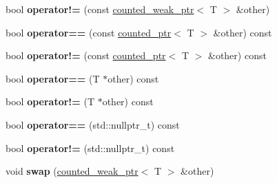 \begin{DoxyCompactItemize}
\item 
\hypertarget{classcounted__weak__ptr_adfcb9a42edff0c699afd47e72a165a14}{}bool {\bfseries operator!=} (const \hyperlink{classcounted__weak__ptr}{counted\+\_\+weak\+\_\+ptr}$<$ T $>$ \&other)\label{classcounted__weak__ptr_adfcb9a42edff0c699afd47e72a165a14}

\item 
\hypertarget{classcounted__weak__ptr_a04aa2371e4e2d71230e1e952ea9da793}{}bool {\bfseries operator==} (const \hyperlink{classcounted__ptr}{counted\+\_\+ptr}$<$ T $>$ \&other) const \label{classcounted__weak__ptr_a04aa2371e4e2d71230e1e952ea9da793}

\item 
\hypertarget{classcounted__weak__ptr_a40a0757cf0447091c9c8d5b0ed234099}{}bool {\bfseries operator!=} (const \hyperlink{classcounted__ptr}{counted\+\_\+ptr}$<$ T $>$ \&other) const \label{classcounted__weak__ptr_a40a0757cf0447091c9c8d5b0ed234099}

\item 
\hypertarget{classcounted__weak__ptr_a095a85f9420640e1a72f8a5edc960cdc}{}bool {\bfseries operator==} (T $\ast$other) const \label{classcounted__weak__ptr_a095a85f9420640e1a72f8a5edc960cdc}

\item 
\hypertarget{classcounted__weak__ptr_ae27043827d4a72b93bf8b32e742e8a50}{}bool {\bfseries operator!=} (T $\ast$other) const \label{classcounted__weak__ptr_ae27043827d4a72b93bf8b32e742e8a50}

\item 
\hypertarget{classcounted__weak__ptr_a52118a11f54a35cda99a1d8feac81218}{}bool {\bfseries operator==} (std\+::nullptr\+\_\+t) const \label{classcounted__weak__ptr_a52118a11f54a35cda99a1d8feac81218}

\item 
\hypertarget{classcounted__weak__ptr_af7dca081b7e3a53719e0a2fd34451785}{}bool {\bfseries operator!=} (std\+::nullptr\+\_\+t) const \label{classcounted__weak__ptr_af7dca081b7e3a53719e0a2fd34451785}

\item 
\hypertarget{classcounted__weak__ptr_ac82b4d321e02d521d54dc31797d977d1}{}void {\bfseries swap} (\hyperlink{classcounted__weak__ptr}{counted\+\_\+weak\+\_\+ptr}$<$ T $>$ \&other)\label{classcounted__weak__ptr_ac82b4d321e02d521d54dc31797d977d1}


\end{DoxyCompactItemize}
